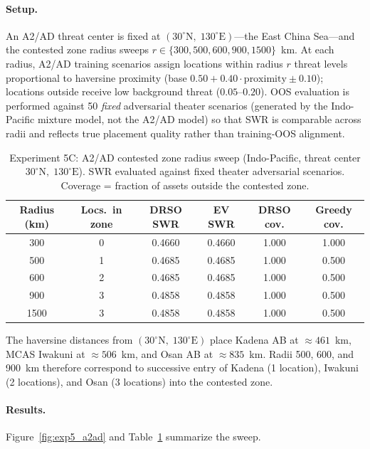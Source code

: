 \documentclass[11pt]{article}
\begin{document}
\paragraph{Setup.}
An A2/AD threat center is fixed at $(30^\circ\mathrm{N},\;
130^\circ\mathrm{E})$---the East China Sea---and the contested zone
radius sweeps $r \in \{300, 500, 600, 900, 1500\}$~km.
At each radius, A2/AD training scenarios assign locations within
radius $r$ threat levels proportional to haversine proximity
(base $0.50 + 0.40 \cdot \text{proximity} \pm 0.10$); locations
outside receive low background threat ($0.05$--$0.20$).
OOS evaluation is performed against 50 \emph{fixed} adversarial
theater scenarios (generated by the Indo-Pacific mixture model, not
the A2/AD model) so that SWR is comparable across radii and reflects
true placement quality rather than training-OOS alignment.

\begin{table}[htbp]
\centering
\caption{Experiment 5C: A2/AD contested zone radius sweep (Indo-Pacific,
threat center $30^\circ\mathrm{N},\;130^\circ\mathrm{E}$).
SWR evaluated against fixed theater adversarial scenarios.
Coverage = fraction of assets outside the contested zone.}
\label{tab:exp5_a2ad}
\begin{tabular}{cccccc}
\toprule
Radius (km) & Locs.\ in zone & DRSO SWR & EV SWR & DRSO cov. & Greedy cov. \\
\midrule
 300 & 0 & 0.4660 & 0.4660 & 1.000 & 1.000 \\
 500 & 1 & 0.4685 & 0.4685 & 1.000 & 0.500 \\
 600 & 2 & 0.4685 & 0.4685 & 1.000 & 0.500 \\
 900 & 3 & 0.4858 & 0.4858 & 1.000 & 0.500 \\
1500 & 3 & 0.4858 & 0.4858 & 1.000 & 0.500 \\
\bottomrule
\end{tabular}
\end{table}

The haversine distances from $(30^\circ\mathrm{N},\;130^\circ\mathrm{E})$
place Kadena AB at $\approx 461$~km, MCAS Iwakuni at $\approx 506$~km,
and Osan AB at $\approx 835$~km.
Radii 500, 600, and 900~km therefore correspond to successive entry of
Kadena (1 location), Iwakuni (2 locations), and Osan (3 locations) into
the contested zone.

\paragraph{Results.}
Figure~\ref{fig:exp5_a2ad} and Table~\ref{tab:exp5_a2ad} summarize
the sweep.
\end{document}
